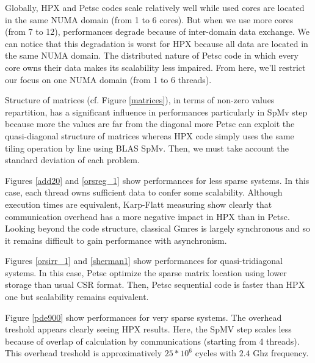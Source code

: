 \documentclass[smallextended]{svjour3}
\begin{document}
Globally, HPX and Petsc codes scale relatively well while used cores are located in the same NUMA domain (from 1 to 6 cores). But when we use more cores (from 7 to 12), performances degrade because of inter-domain data exchange. We can notice that this degradation is worst for HPX because all data are located in the same NUMA domain. The distributed nature of Petsc code in which every core owns their data makes its scalability less impaired. From here, we'll restrict our focus on one NUMA domain (from 1 to 6 threads).\smallskip

Structure of matrices (cf. Figure \ref{matrices}), in terms of non-zero values repartition, has a significant influence in performances particularly in SpMv step because more the values are far from the diagonal more Petsc can exploit the quasi-diagonal structure of matrices whereas HPX code simply uses the same tiling operation by line using BLAS SpMv. Then, we must take account the standard deviation of each problem.\smallskip     

Figures \ref{add20} and \ref{orsreg_1} show performances for less sparse systems. In this case, each thread owns sufficient data to confer some scalability. Although execution times are equivalent, Karp-Flatt measuring show clearly that communication overhead has a more negative impact in HPX than in Petsc. Looking beyond the code structure, classical Gmres is largely synchronous and so it remains difficult to gain performance with asynchronism.\smallskip

Figures \ref{orsirr_1} and \ref{sherman1} show performances for quasi-tridiagonal systems. In this case, Petsc optimize the sparse matrix location using lower storage than usual CSR format. Then, Petsc sequential code is faster than HPX one but scalability remains equivalent.\smallskip

Figure \ref{pde900} show performances for very sparse systems. The overhead treshold appears clearly seeing HPX results. Here, the SpMV step scales less because of overlap of calculation by communications (starting from 4 threads). This overhead treshold is approximatively $25*10^{6}$ cycles with $2.4$ Ghz frequency.
\end{document}
